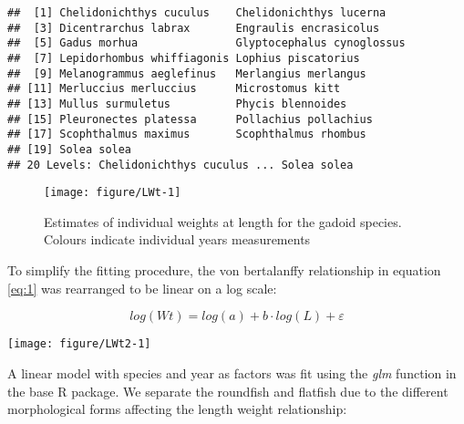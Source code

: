 \documentclass[12pt]{article}\usepackage[]{graphicx}\usepackage[]{color}
\makeatletter
\def\maxwidth{ %
  \ifdim\Gin@nat@width>\linewidth
    \linewidth
  \else
    \Gin@nat@width
  \fi
}
\newenvironment{kframe}{%
 \def\at@end@of@kframe{}%
 \ifinner\ifhmode%
  \def\at@end@of@kframe{\end{minipage}}%
  \begin{minipage}{\columnwidth}%
 \fi\fi%
 \def\FrameCommand##1{\hskip\@totalleftmargin \hskip-\fboxsep
 \colorbox{shadecolor}{##1}\hskip-\fboxsep
     \hskip-\linewidth \hskip-\@totalleftmargin \hskip\columnwidth}%
 \MakeFramed {\advance\hsize-\width
   \@totalleftmargin\z@ \linewidth\hsize
   \@setminipage}}%
 {\par\unskip\endMakeFramed%
 \at@end@of@kframe}
\newenvironment{knitrout}{}{} %
\makeatother
\begin{document}
\begin{knitrout}\footnotesize
{}\color{fgcolor}\begin{kframe}
\begin{verbatim}
##  [1] Chelidonichthys cuculus    Chelidonichthys lucerna   
##  [3] Dicentrarchus labrax       Engraulis encrasicolus    
##  [5] Gadus morhua               Glyptocephalus cynoglossus
##  [7] Lepidorhombus whiffiagonis Lophius piscatorius       
##  [9] Melanogrammus aeglefinus   Merlangius merlangus      
## [11] Merluccius merluccius      Microstomus kitt          
## [13] Mullus surmuletus          Phycis blennoides         
## [15] Pleuronectes platessa      Pollachius pollachius     
## [17] Scophthalmus maximus       Scophthalmus rhombus      
## [19] Solea solea               
## 20 Levels: Chelidonichthys cuculus ... Solea solea
\end{verbatim}
\end{kframe}\begin{figure}
\texttt{[image: figure/LWt-1]} \caption[Estimates of individual weights at length for the gadoid species]{Estimates of individual weights at length for the gadoid species. Colours indicate individual years measurements}\label{fig:LWt}
\end{figure}


\end{knitrout}

To simplify the fitting procedure, the von bertalanffy relationship in equation
\ref{eq:1} was rearranged to be linear on a log scale:

\begin{equation}\label{eq:2}
	log(Wt) = log(a) + b \cdot log(L) + \varepsilon
\end{equation} 

\vspace{1cm}

\begin{knitrout}\footnotesize
{}\color{fgcolor}
\texttt{[image: figure/LWt2-1]} 

\end{knitrout}

A linear model with species and year as factors was fit using the \textit{glm}
function in the base R package. We separate the roundfish and flatfish due to
the different morphological forms affecting the length weight relationship:
\end{document}
